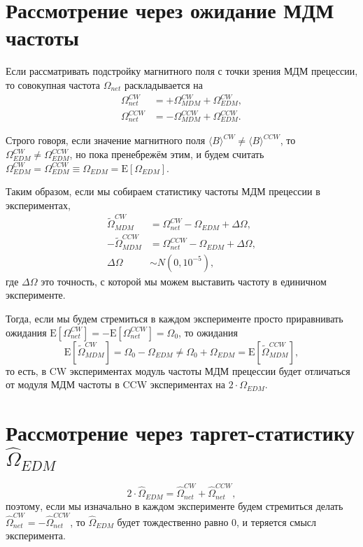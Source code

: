 \documentclass{article}
\newcommand{\Xpct}[1]{\mathrm{E}\left[{#1}\right]}
\newcommand{\avg}[1]{\langle{#1}\rangle}
\newcommand{\W}{\Omega}
\begin{document}
\section{Рассмотрение через ожидание МДМ частоты}
Если рассматривать подстройку магнитного поля с точки зрения МДМ прецессии, то
совокупная частота $\W_{net}$ раскладывается на
\begin{align*}
  \W_{net}^{CW} &= +\W_{MDM}^{CW} + \W_{EDM}^{CW}, \\
  \W_{net}^{CCW} &= -\W_{MDM}^{CCW} + \W_{EDM}^{CCW}.
\end{align*}

Строго говоря, если значение магнитного поля $\avg{B}^{CW}\neq \avg{B}^{CCW}$, то $\W_{EDM}^{CW}\neq\W_{EDM}^{CCW}$,
но пока пренебрежём этим, и будем считать $\W_{EDM}^{CW} = \W_{EDM}^{CCW} \equiv \W_{EDM} = \Xpct{\W_{EDM}}$.

Таким образом, если мы собираем статистику частоты МДМ прецессии в экспериментах,
\begin{align*}
  \tilde\W_{MDM}^{CW} &= \W_{net}^{CW} - \W_{EDM} + \Delta\W, \\
  -\tilde\W_{MDM}^{CCW} &= \W_{net}^{CCW} - \W_{EDM} + \Delta\W, \\
  \Delta\W &\sim N(0, 10^{-5}),
\end{align*}
где $\Delta\W$ это точность,  с которой мы можем выставить частоту в единичном эксперименте.

Тогда, если мы будем стремиться в каждом эксперименте просто приравнивать ожидания
$\Xpct{\W_{net}^{CW}} = -\Xpct{\W_{net}^{CCW}} = \W_0$, то ожидания
\[
\Xpct{\tilde\W_{MDM}^{CW}} = \W_0 -\W_{EDM} \neq \W_0 + \W_{EDM} = \Xpct{\tilde\W_{MDM}^{CCW}},
\]
то есть, в CW экспериментах модуль частоты МДМ прецессии будет отличаться
от модуля МДМ частоты в CCW экспериментах на $2\cdot \W_{EDM}$.

\section{Рассмотрение через таргет-статистику $\hat\W_{EDM}$}
\[
2\cdot \hat\W_{EDM} = \hat\W_{net}^{CW} + \hat\W_{net}^{CCW},
\]
поэтому, если мы изначально в каждом эксперименте будем стремиться делать
$\hat\W_{net}^{CW} = -\hat\W_{net}^{CCW}$, то $\hat\W_{EDM}$ будет тождественно равно 0,
и теряется смысл эксперимента.
\end{document}
